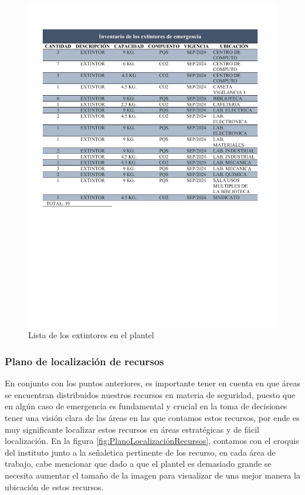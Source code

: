     
    \begin{figure}[H]
      \centering
      \includegraphics[trim = {11mm 100mm 12mm 15mm},clip,scale=0.4]{22/Img/inventarioDeExtintores.pdf}
       \caption{Lista de los extintores en el plantel}
       \label{fig:Extintores}
     \end{figure}
    
    
    \subsubsection{Plano de localización de recursos}
    
    En conjunto con los puntos anteriores, es importante tener en cuenta en que áreas se encuentran distribuidos nuestros recursos en materia de seguridad, puesto que en algún caso de emergencia es fundamental y crucial en la toma de decisiones tener una visión clara de las áreas en las que contamos estos recursos, por ende es muy significante localizar estos recursos en áreas estratégicas y de fácil localización. En la figura \ref{fig:PlanoLocalizaciónRecursos}, contamos con el croquis del instituto junto a la señaletica pertinente de los recurso, en cada área de trabajo, cabe mencionar que dado a que el plantel es demasiado grande se necesita aumentar el tamaño de la imagen para visualizar de una mejor manera la ubicación de estos recursos.
    

